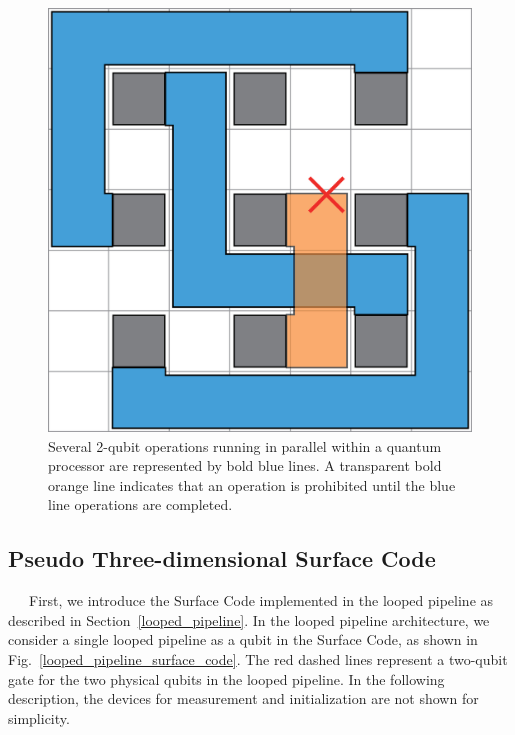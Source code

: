 \documentclass[a4paper,11pt]{ltjsarticle}
\begin{document}
{{        \begin{figure}[h]
            \centering
            \includegraphics[scale=0.13]{figure/qubit_plane.eps}
            \vspace{0pt}\caption{Several 2-qubit operations running in parallel within a quantum processor are represented by bold blue lines. A transparent bold orange line indicates that an operation is prohibited until the blue line operations are completed.}
            \label{qubit_plane}
            \vspace{-10pt}
        \end{figure}
        
    }

    \subsection{Pseudo Three-dimensional Surface Code}{
        \ \ \ First, we introduce the Surface Code implemented in the looped pipeline as described in Section~\ref{looped_pipeline}. In the looped pipeline architecture, we consider a single looped pipeline as a qubit in the Surface Code, as shown in Fig.~\ref{looped_pipeline_surface_code}. The red dashed lines represent a two-qubit gate for the two physical qubits in the looped pipeline. In the following description, the devices for measurement and initialization are not shown for simplicity.

}}
\end{document}
